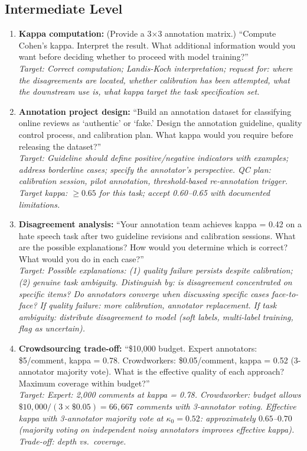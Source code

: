 \subsection{Intermediate Level}

\begin{enumerate}
    \item \textbf{Kappa computation:} (Provide a 3$\times$3 annotation matrix.) ``Compute Cohen's kappa. Interpret the result. What additional information would you want before deciding whether to proceed with model training?''\\
    \textit{Target: Correct computation; Landis-Koch interpretation; request for: where the disagreements are located, whether calibration has been attempted, what the downstream use is, what kappa target the task specification set.}

    \item \textbf{Annotation project design:} ``Build an annotation dataset for classifying online reviews as `authentic' or `fake.' Design the annotation guideline, quality control process, and calibration plan. What kappa would you require before releasing the dataset?''\\
    \textit{Target: Guideline should define positive/negative indicators with examples; address borderline cases; specify the annotator's perspective. QC plan: calibration session, pilot annotation, threshold-based re-annotation trigger. Target kappa: $\geq 0.65$ for this task; accept 0.60--0.65 with documented limitations.}

    \item \textbf{Disagreement analysis:} ``Your annotation team achieves kappa = 0.42 on a hate speech task after two guideline revisions and calibration sessions. What are the possible explanations? How would you determine which is correct? What would you do in each case?''\\
    \textit{Target: Possible explanations: (1) quality failure persists despite calibration; (2) genuine task ambiguity. Distinguish by: is disagreement concentrated on specific items? Do annotators converge when discussing specific cases face-to-face? If quality failure: more calibration, annotator replacement. If task ambiguity: distribute disagreement to model (soft labels, multi-label training, flag as uncertain).}

    \item \textbf{Crowdsourcing trade-off:} ``\$10,000 budget. Expert annotators: \$5/comment, kappa = 0.78. Crowdworkers: \$0.05/comment, kappa = 0.52 (3-annotator majority vote). What is the effective quality of each approach? Maximum coverage within budget?''\\
    \textit{Target: Expert: 2,000 comments at kappa = 0.78. Crowdworker: budget allows $\$10,000 / (3 \times \$0.05) = 66,667$ comments with 3-annotator voting. Effective kappa with 3-annotator majority vote at $\kappa_0 = 0.52$: approximately $0.65$--$0.70$ (majority voting on independent noisy annotators improves effective kappa). Trade-off: depth vs.\ coverage.}
\end{enumerate}

